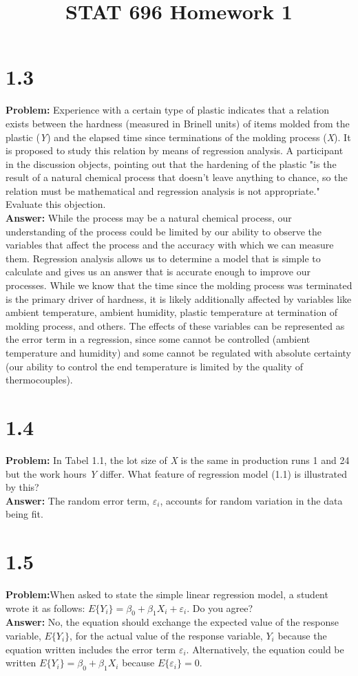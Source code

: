 \documentclass[12pt]{article}
\begin{document}
\title{STAT 696 Homework 1}
\section*{1.3}
\textbf{Problem:}
Experience with a certain type of plastic indicates that a relation exists between the hardness (measured in Brinell units) of items molded from the plastic (\textit{Y}) and the elapsed time since terminations of the molding process (\textit{X}). It is proposed to study this relation by means of regression analysis. A participant in the discussion objects, pointing out that the hardening of the plastic "is the result of a natural chemical process that doesn't leave anything to chance, so the relation must be mathematical and 
regression analysis is not appropriate." Evaluate this objection.\\
\newline
\textbf{Answer:}
While the process may be a natural chemical process, our understanding of the process could be limited by our ability to observe the variables that affect the process and the accuracy with which we can measure them. Regression analysis allows us to determine a model that is simple to calculate and gives us an answer that is accurate enough to improve our processes. While we know that the time since the molding process was terminated is the primary driver of hardness, it is likely additionally affected by variables
like ambient temperature, ambient humidity, plastic temperature at termination of molding process, and others. The effects of these variables can be represented as the error term in a regression, since some cannot be controlled (ambient temperature and humidity) and some cannot be regulated with absolute certainty (our ability to control the end temperature is limited by the quality of thermocouples). 

\section*{1.4}
\textbf{Problem:}
In Tabel 1.1, the lot size of \textit{X} is the same in production runs 1 and 24 but the work hours \textit{Y} differ. What feature of regression model (1.1) is illustrated by this?\\
\newline
\textbf{Answer:}
The random error term, $\varepsilon_i$, accounts for random variation in the data being fit.

\section*{1.5}
\textbf{Problem:}When asked to state the simple linear regression model, a student wrote it as follows: $E \{ Y_i \}=\beta_0+\beta_1 X_i+\varepsilon_i$. Do you agree?\\
\newline
\textbf{Answer:}
No, the equation should exchange the expected value of the response variable, $E \{Y_i\}$, for the actual value of the response variable, $Y_i$ because the equation written includes the error term $\varepsilon_i$. Alternatively, the equation could be written $E \{Y_i\}=\beta_0+\beta_1 X_i$ because $E \{\varepsilon_i\}=0$.
\end{document}
